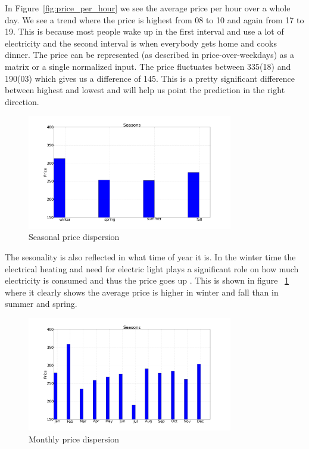In Figure~\ref{fig:price_per_hour} we see the average price per hour over a whole day. We see a trend where the price is highest from 08 to 10 and again from 17 to 19. This is because most people wake up in the first interval and use a lot of electricity and the second interval is when everybody gets home and cooks dinner. The price can be represented (as described in price-over-weekdays) as a matrix or a single normalized input. The price fluctuates between 335(18) and 190(03) which gives us a difference of 145. This is a pretty significant difference between highest and lowest and will help us point the prediction in the right direction.

\begin{figure}[H]
\centering
\includegraphics[width=0.8\textwidth ]{billeder/energy_price_plots/seasons.png}
\caption{Seasonal price dispersion}
\label{fig:seasons}
\end{figure}

The sesonality is also reflected in what time of year it is. In the winter time the electrical heating and need for electric light plays a significant role on how much electricity is consumed and thus the price goes up \cite{crowley2005weather}. This is shown in figure ~\ref{fig:seasons} where it clearly shows the average price is higher in winter and fall than in summer and spring.

\begin{figure}[H]
\centering
\includegraphics[width=0.8\textwidth ]{billeder/energy_price_plots/averageMonthlyPrice.png}
\caption{Monthly price dispersion}
\label{fig:monthlyAveragePrice}
\end{figure}

